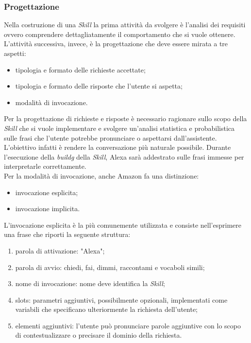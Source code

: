 		\subsubsection{Progettazione}
		Nella costruzione di una \emph{Skill} la prima attività da svolgere è l'analisi dei requisiti ovvero comprendere dettagliatamente il comportamento che si vuole ottenere. L'attività successiva, invece, è la progettazione che deve essere mirata a tre aspetti:
		\begin{itemize}
			\item tipologia e formato delle richieste accettate;
			\item tipologia e formato delle risposte che l'utente si aspetta;
			\item modalità di invocazione.
		\end{itemize}
		Per la progettazione di richieste e risposte è necessario ragionare sullo scopo della \emph{Skill} che si vuole implementare e svolgere un'analisi statistica e probabilistica sulle frasi che l'utente potrebbe pronunciare o aspettarsi dall'assistente. L'obiettivo infatti è rendere la conversazione più naturale possibile. Durante l'esecuzione della \emph{\gls{buildg}} della \emph{Skill}, Alexa sarà addestrato sulle frasi immesse per interpretarle correttamente. \\
		Per la modalità di invocazione, anche Amazon fa una distinzione:
		\begin{itemize}
			\item invocazione esplicita;
			\item invocazione implicita.
		\end{itemize}
		L'invocazione esplicita è la più comunemente utilizzata e consiste nell'esprimere una frase che riporti la seguente struttura:
		\begin{enumerate}
			\item parola di attivazione: "Alexa";
			\item parola di avvio: chiedi, fai, dimmi, raccontami e vocaboli simili;
			\item nome di invocazione: nome deve identifica la \emph{Skill};
			\item slots: parametri aggiuntivi, possibilmente opzionali, implementati come variabili che specificano ulteriormente la richiesta dell'utente;
			\item elementi aggiuntivi: l'utente può pronunciare parole aggiuntive con lo scopo di contestualizzare o precisare il dominio della richiesta.
		\end{enumerate}
